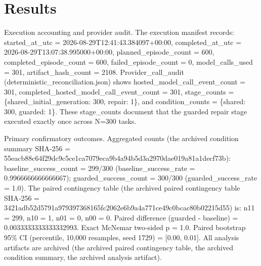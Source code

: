 \documentclass[conference]{IEEEtran}
\begin{document}
\section{Results}
Execution accounting and provider audit. The execution manifest records: started\_at\_utc = 2026-08-29T12:41:43.384097+00:00, completed\_at\_utc = 2026-08-29T13:07:38.995000+00:00, planned\_episode\_count = 600, completed\_episode\_count = 600, failed\_episode\_count = 0, model\_calls\_used = 301, artifact\_hash\_count = 2108. Provider\_call\_audit (deterministic\_reconciliation.json) shows hosted\_model\_call\_event\_count = 301, completed\_hosted\_model\_call\_event\_count = 301, stage\_counts = \{shared\_initial\_generation: 300, repair: 1\}, and condition\_counts = \{shared: 300, guarded: 1\}. These stage\_counts document that the guarded repair stage executed exactly once across N=300 tasks.

Primary confirmatory outcomes. Aggregated counts (the archived condition summary SHA‑256 = 55eacb88\allowbreak{}c64f29dc\allowbreak{}9c5ce1ca\allowbreak{}7079eca9\allowbreak{}b4a94b5d\allowbreak{}3a2970da\allowbreak{}e019a81a\allowbreak{}1decf73b): baseline\_success\_count = 299/300 (baseline\_success\_rate = 0.9966666666666667); guarded\_success\_count = 300/300 (guarded\_success\_rate = 1.0). The paired contingency table (the archived paired contingency table SHA‑256 = 3421adb5\allowbreak{}2d5791a9\allowbreak{}79397368\allowbreak{}165fc206\allowbreak{}2e6b9a4a\allowbreak{}771ce49c\allowbreak{}0bcac80b\allowbreak{}02215d55) is: n11 = 299, n10 = 1, n01 = 0, n00 = 0. Paired difference (guarded - baseline) = 0.0033333333333332993. Exact McNemar two‑sided p = 1.0. Paired bootstrap 95\% CI (percentile, 10,000 resamples, seed 1729) = [0.00, 0.01]. All analysis artifacts are archived (the archived paired contingency table, the archived condition summary, the archived analysis artifact).
\end{document}
